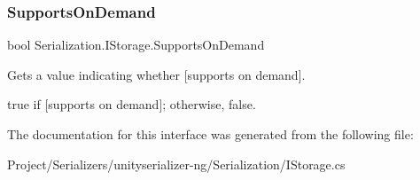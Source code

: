 \subsubsection{\texorpdfstring{Supports\+On\+Demand}{SupportsOnDemand}}
{\footnotesize\ttfamily bool Serialization.\+I\+Storage.\+Supports\+On\+Demand\hspace{0.3cm}{\ttfamily [get]}}



Gets a value indicating whether \mbox{[}supports on demand\mbox{]}. 

{\ttfamily true} if \mbox{[}supports on demand\mbox{]}; otherwise, {\ttfamily false}.

The documentation for this interface was generated from the following file\+:\begin{DoxyCompactItemize}
\item 
Project/\+Serializers/unityserializer-\/ng/\+Serialization/I\+Storage.\+cs\end{DoxyCompactItemize}
